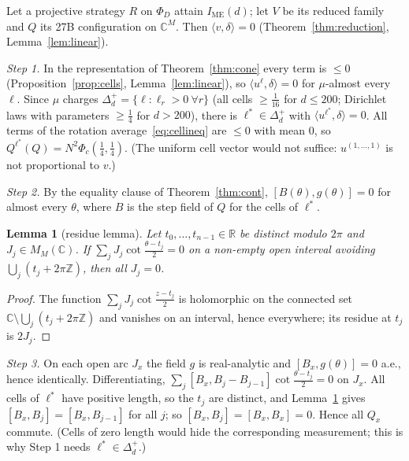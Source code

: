 \documentclass[11pt]{amsart}
\newtheorem{lemma}[theorem]{Lemma}
\theoremstyle{definition}
\theoremstyle{remark}
\numberwithin{equation}{section}
\newcommand{\R}{\mathbb{R}}
\newcommand{\C}{\mathbb{C}}
\newcommand{\Z}{\mathbb{Z}}
\newcommand{\IME}{I_{\mathrm{ME}}}
\begin{document}
Let a projective strategy $R$ on $\Phi_D$ attain $\IME(d)$; let $V$ be its reduced family and $Q$ its 27B
configuration on $\C^M$. Then $\langle v,\delta\rangle=0$ (Theorem~\ref{thm:reduction}, Lemma~\ref{lem:linear}).

\emph{Step 1.} In the representation of Theorem~\ref{thm:cone} every term is $\le0$
(Proposition~\ref{prop:cells}, Lemma~\ref{lem:linear}), so $\langle u^\ell,\delta\rangle=0$ for $\mu$-almost every
$\ell$. Since $\mu$ charges $\Delta^+_d=\{\ell:\ell_r>0\ \forall r\}$ (all cells $\ge\frac1{16}$ for $d\le200$; Dirichlet
laws with parameters $\ge\frac14$ for $d>200$), there is $\ell^*\in\Delta_d^+$ with $\langle u^{\ell^*},\delta\rangle=0$.
All terms of the rotation average~\eqref{eq:cellineq} are $\le0$ with mean $0$, so
$Q^{\ell^*}(Q)=N^2\Phi_c(\frac14,\frac14)$. (The uniform cell vector would not suffice: $u^{(1,\dots,1)}$ is not
proportional to $v$.)

\emph{Step 2.} By the equality clause of Theorem~\ref{thm:cont}, $[B(\theta),g(\theta)]=0$ for almost every $\theta$,
where $B$ is the step field of $Q$ for the cells of $\ell^*$.

\begin{lemma}[residue lemma]\label{lem:residue}
Let $t_0,\dots,t_{n-1}\in\R$ be distinct modulo $2\pi$ and $J_j\in M_M(\C)$. If
$\sum_jJ_j\cot\frac{\theta-t_j}2=0$ on a non-empty open interval avoiding $\bigcup_j(t_j+2\pi\Z)$, then all $J_j=0$.
\end{lemma}

\begin{proof}
The function $\sum_jJ_j\cot\frac{z-t_j}2$ is holomorphic on the connected set $\C\setminus\bigcup_j(t_j+2\pi\Z)$ and
vanishes on an interval, hence everywhere; its residue at $t_j$ is $2J_j$.
\end{proof}

\emph{Step 3.} On each open arc $J_x$ the field $g$ is real-analytic and $[B_x,g(\theta)]=0$ a.e., hence identically.
Differentiating, $\sum_j[B_x,B_j-B_{j-1}]\cot\frac{\theta-t_j}2=0$ on $J_x$. All cells of $\ell^*$ have positive length,
so the $t_j$ are distinct, and Lemma~\ref{lem:residue} gives $[B_x,B_j]=[B_x,B_{j-1}]$ for all $j$; so
$[B_x,B_j]=[B_x,B_x]=0$. Hence all $Q_x$ commute. (Cells of zero length would hide the corresponding measurement; this
is why Step 1 needs $\ell^*\in\Delta^+_d$.)
\end{document}
